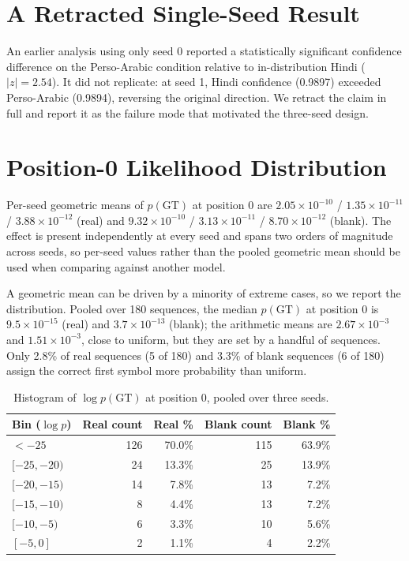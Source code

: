 \documentclass{article}
\begin{document}



\appendix

\section{A Retracted Single-Seed Result}
\label{app:retraction}

An earlier analysis using only seed 0 reported a statistically significant confidence
difference on the Perso-Arabic condition relative to in-distribution Hindi ($|z| = 2.54$). It
did not replicate: at seed 1, Hindi confidence (0.9897) exceeded Perso-Arabic (0.9894),
reversing the original direction. We retract the claim in full and report it as the failure
mode that motivated the three-seed design.

\section{Position-0 Likelihood Distribution}
\label{app:pos0}

Per-seed geometric means of $p(\mathrm{GT})$ at position 0 are $2.05\times10^{-10}$ /
$1.35\times10^{-11}$ / $3.88\times10^{-12}$ (real) and $9.32\times10^{-10}$ /
$3.13\times10^{-11}$ / $8.70\times10^{-12}$ (blank). The effect is present independently at
every seed and spans two orders of magnitude across seeds, so per-seed values rather than the
pooled geometric mean should be used when comparing against another model.

A geometric mean can be driven by a minority of extreme cases, so we report the distribution.
Pooled over 180 sequences, the median $p(\mathrm{GT})$ at position 0 is $9.5\times10^{-15}$
(real) and $3.7\times10^{-13}$ (blank); the arithmetic means are $2.67\times10^{-3}$ and
$1.51\times10^{-3}$, close to uniform, but they are set by a handful of sequences. Only
2.8\% of real sequences (5 of 180) and 3.3\% of blank sequences (6 of 180) assign the correct
first symbol more probability than uniform.

\begin{table}[h]
\small
\centering
\caption{Histogram of $\log p(\mathrm{GT})$ at position 0, pooled over three seeds.}
\begin{tabular}{lrrrr}
\toprule
Bin ($\log p$) & Real count & Real \% & Blank count & Blank \% \\
\midrule
$< -25$        & 126 & 70.0\% & 115 & 63.9\% \\
$[-25, -20)$   & 24  & 13.3\% & 25  & 13.9\% \\
$[-20, -15)$   & 14  & 7.8\%  & 13  & 7.2\%  \\
$[-15, -10)$   & 8   & 4.4\%  & 13  & 7.2\%  \\
$[-10, -5)$    & 6   & 3.3\%  & 10  & 5.6\%  \\
$[-5, 0]$      & 2   & 1.1\%  & 4   & 2.2\%  \\
\bottomrule
\end{tabular}
\end{table}
\end{document}
